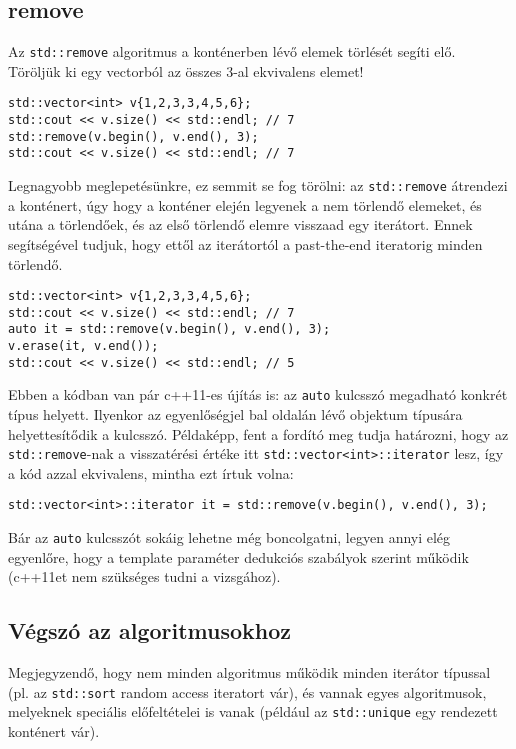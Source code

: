 \documentclass[a4paper,11.5pt,table]{article}
\begin{document}
	\subsection{remove}
	Az \texttt{std::remove} algoritmus a konténerben lévő elemek törlését segíti elő. Töröljük ki egy vectorból az összes 3-al ekvivalens elemet!
	\begin{lstlisting}
std::vector<int> v{1,2,3,3,4,5,6};
std::cout << v.size() << std::endl; // 7
std::remove(v.begin(), v.end(), 3);
std::cout << v.size() << std::endl; // 7
	\end{lstlisting}
	Legnagyobb meglepetésünkre, ez semmit se fog törölni: az \texttt{std::remove} átrendezi a konténert, úgy hogy a konténer elején legyenek a nem törlendő elemeket, és utána a törlendőek, és az első törlendő elemre visszaad egy iterátort. Ennek segítségével tudjuk, hogy ettől az iterátortól a past-the-end iteratorig minden törlendő.
	\begin{lstlisting}
std::vector<int> v{1,2,3,3,4,5,6};
std::cout << v.size() << std::endl; // 7
auto it = std::remove(v.begin(), v.end(), 3);
v.erase(it, v.end());
std::cout << v.size() << std::endl; // 5
	\end{lstlisting}
	\begin{note}
		Ebben a kódban van pár c++11-es újítás is: az \texttt{auto} kulcsszó megadható konkrét típus helyett. Ilyenkor az egyenlőségjel bal oldalán lévő objektum típusára helyettesítődik a kulcsszó. Példaképp, fent a fordító meg tudja határozni, hogy az \texttt{std::remove}-nak a visszatérési értéke itt \texttt{std::vector<int>::iterator} lesz, így a kód azzal ekvivalens, mintha ezt írtuk volna:
		
		{\centering\texttt{std::vector<int>::iterator it = std::remove(v.begin(), v.end(), 3);} \par}
		
		Bár az \texttt{auto} kulcsszót sokáig lehetne még boncolgatni, legyen annyi elég egyenlőre, hogy a template paraméter dedukciós szabályok szerint működik (c++11et nem szükséges tudni a vizsgához).
	\end{note}
	\subsection{Végszó az algoritmusokhoz}
	Megjegyzendő, hogy nem minden algoritmus működik minden iterátor típussal (pl. az \texttt{std::sort} random access iteratort vár), és vannak egyes algoritmusok, melyeknek speciális előfeltételei is vanak (például az \texttt{std::unique} egy rendezett konténert vár).
	\medskip
	
\end{document}
